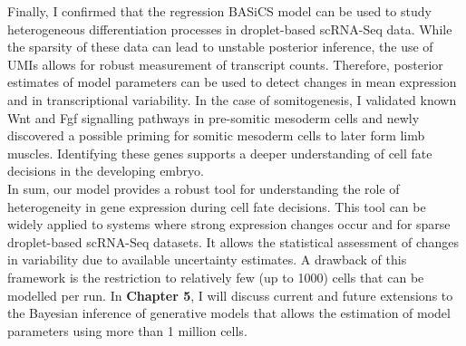 Finally, I confirmed that the regression BASiCS model can be used to study heterogeneous differentiation processes in droplet-based scRNA-Seq data. 
While the sparsity of these data can lead to unstable posterior inference, the use of UMIs allows for robust measurement of transcript counts. 
Therefore, posterior estimates of model parameters can be used to detect changes in mean expression and in transcriptional variability. 
In the case of somitogenesis, I validated known Wnt and Fgf signalling pathways in pre-somitic mesoderm cells and newly discovered a possible priming for somitic mesoderm cells to later form limb muscles. 
Identifying these genes supports a deeper understanding of cell fate decisions in the developing embryo.\\

In sum, our model provides a robust tool for understanding the role of heterogeneity in gene expression during cell fate decisions. 
This tool can be widely applied to systems where strong expression changes occur and for sparse droplet-based scRNA-Seq datasets. 
It allows the statistical assessment of changes in variability due to available uncertainty estimates. 
A drawback of this framework is the restriction to relatively few (up to 1000) cells that can be modelled per run. 
In \textbf{Chapter 5}, I will discuss current and future extensions to the Bayesian inference of generative models that allows the estimation of model parameters using more than 1 million cells.


